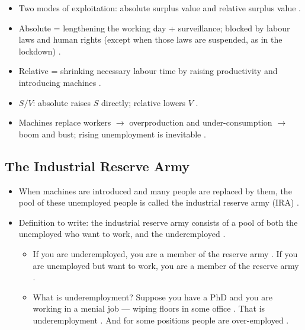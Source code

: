 \begin{QuickRevision}
\begin{itemize}
    \item Two modes of exploitation: absolute surplus value and relative surplus value .
    \item Absolute = lengthening the working day + surveillance; blocked by labour laws and human rights (except when those laws are suspended, as in the lockdown) .
    \item Relative = shrinking necessary labour time by raising productivity and introducing machines .
    \item $S/V$: absolute raises $S$ directly; relative lowers $V$ .
    \item Machines replace workers $\rightarrow$ overproduction and under-consumption $\rightarrow$ boom and bust; rising unemployment is inevitable .
\end{itemize}
\end{QuickRevision}

\subsection{The Industrial Reserve Army}
\begin{itemize}
    \item When machines are introduced and many people are replaced by them, the pool of these unemployed people is called the industrial reserve army (IRA) .
    \item Definition to write: the industrial reserve army consists of a pool of both the unemployed who want to work, and the underemployed .
    \begin{itemize}
        \item If you are underemployed, you are a member of the reserve army . If you are unemployed but want to work, you are a member of the reserve army .
        \item What is underemployment? Suppose you have a PhD and you are working in a menial job --- wiping floors in some office . That is underemployment . And for some positions people are over-employed .
    \end{itemize}
\end{itemize}

